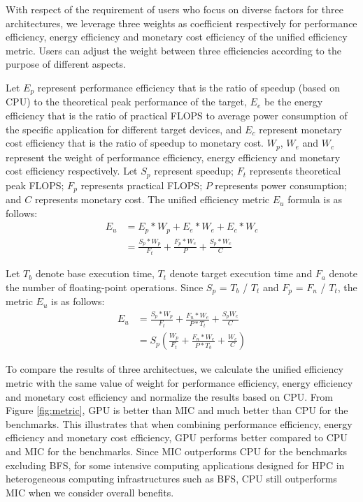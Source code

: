 
With respect of the requirement of users who focus on diverse factors for three architectures, we leverage three weights as coefficient respectively for performance efficiency, energy efficiency and monetary cost efficiency of the unified efficiency metric. Users can adjust the weight between three efficiencies according to the purpose of different aspects.

Let $E_{p}$ represent performance efficiency that is the ratio of speedup (based on CPU) to the theoretical peak performance of the target, $E_{e}$ be the energy efficiency that is the ratio of practical FLOPS to average power consumption of the specific application for different target devices, and $E_{c}$ represent monetary cost efficiency that is the ratio of speedup to monetary cost. $W_{p}$, $W_{e}$ and $W_{c}$ represent the weight of performance efficiency, energy efficiency and monetary cost efficiency respectively. Let $S_{p}$ represent speedup; $F_{t}$ represents theoretical peak FLOPS; $F_{p}$ represents practical FLOPS; $P$ represents power consumption; and $C$ represents monetary cost. The unified efficiency metric $E_{u}$ formula is as follows:
  \begin{equation}\label{equ:metric1}
    \begin{split}
  {E_{u}} &  = E_{p}*W_{p}+E_{e}*W_{e}+E_{c}*W_{c} \\
   & = \frac{S_{p}*W_{p}}{F_{t}}+\frac{F_{p}*W_{e}}{P}+\frac{S_{p}*W_{c}}{C}
  \end{split}
\end{equation}
  
Let $T_{b}$ denote base execution time, $T_{t}$ denote target execution time and $F_{a}$ denote the number of floating-point operations. Since $S_{p}$ = $T_{b}$ / $T_{t}$ and $F_{p}$ = $F_{n}$ / $T_{t}$, the metric $E_{u}$ is as follows:
  \begin{equation}\label{equ:metric1}
    \begin{split}
  {E_{u}} &  = \frac{S_{p}*W_{p}}{F_{t}}+\frac{F_{n}*W_{e}}{P*T_{t}}+\frac{S_{p}W_{c}}{C} \\
   & = {S_{p}}(\frac{W_{p}}{F_{t}}+\frac{F_{n}*W_{e}}{P*T_{b}}+\frac{W_{c}}{C})
  \end{split}
\end{equation}

  
 To compare the results of three architectues, we calculate the unified efficiency metric with the same value of weight for performance efficiency, energy efficiency and monetary cost efficiency and normalize the results based on CPU. From Figure \ref{fig:metric}, GPU is better than MIC and much better than CPU for the benchmarks. This illustrates that when combining performance efficiency, energy efficiency and monetary cost efficiency, GPU performs better compared to CPU and MIC for the benchmarks. Since MIC outperforms CPU for the benchmarks excluding BFS, for some intensive computing applications designed for HPC in heterogeneous computing infrastructures such as BFS, CPU still outperforms MIC when we consider overall benefits.
